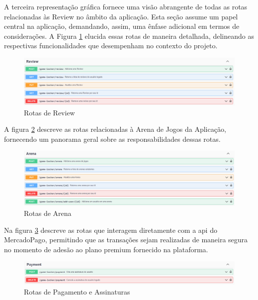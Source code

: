 A terceira representação gráfica fornece uma visão abrangente de todas as rotas relacionadas às \gls{Review} no âmbito da aplicação. Esta seção assume um papel central na aplicação, demandando, assim, uma ênfase adicional em termos de considerações. A Figura \ref{RotasReview} elucida essas rotas de maneira detalhada, delineando as respectivas funcionalidades que desempenham no contexto do projeto.

\begin{figure}[H]
    \centering
	\caption{Rotas de Review}
    \label{RotasReview}
    \includegraphics[scale = 0.38]{imagens/arquitetura/rotas_review.png}	
\end{figure}

A figura \ref{RotasArena} descreve as rotas relacionadas à Arena de Jogos da Aplicação, fornecendo um panorama geral sobre as responsabilidades dessas rotas.

\begin{figure}[H]
    \centering
	\caption{Rotas de Arena}
    \label{RotasArena}
    \includegraphics[scale = 0.38]{imagens/arquitetura/rotas_arena.png}	
\end{figure}

Na figura \ref{RotasPayment} descreve as rotas que interagem diretamente com a \ac{api} do \gls{MercadoPago}, permitindo que as transações sejam realizadas de maneira segura no momento de adesão ao plano premium fornecido na plataforma.

\begin{figure}[H]
    \centering
	\caption{Rotas de Pagamento e Assinaturas}
    \label{RotasPayment}
    \includegraphics[scale = 0.38]{imagens/arquitetura/rotas_payment.png}	
\end{figure}

